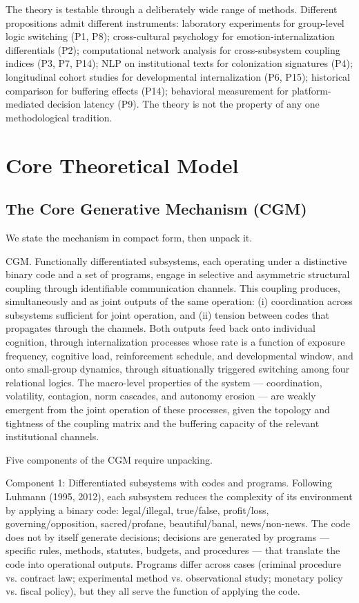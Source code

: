 \documentclass[12pt,a4paper]{article}
\begin{document}
The theory is testable through a deliberately wide range of methods. Different propositions admit different instruments: laboratory experiments for group-level logic switching (P1, P8); cross-cultural psychology for emotion-internalization differentials (P2); computational network analysis for cross-subsystem coupling indices (P3, P7, P14); NLP on institutional texts for colonization signatures (P4); longitudinal cohort studies for developmental internalization (P6, P15); historical comparison for buffering effects (P14); behavioral measurement for platform-mediated decision latency (P9). The theory is not the property of any one methodological tradition.



\section{Core Theoretical Model}

\subsection{The Core Generative Mechanism (CGM)}

We state the mechanism in compact form, then unpack it.


CGM. Functionally differentiated subsystems, each operating under a distinctive binary code and a set of programs, engage in selective and asymmetric structural coupling through identifiable communication channels. This coupling produces, simultaneously and as joint outputs of the same operation: (i) coordination across subsystems sufficient for joint operation, and (ii) tension between codes that propagates through the channels. Both outputs feed back onto individual cognition, through internalization processes whose rate is a function of exposure frequency, cognitive load, reinforcement schedule, and developmental window, and onto small-group dynamics, through situationally triggered switching among four relational logics. The macro-level properties of the system --- coordination, volatility, contagion, norm cascades, and autonomy erosion --- are weakly emergent from the joint operation of these processes, given the topology and tightness of the coupling matrix and the buffering capacity of the relevant institutional channels.


Five components of the CGM require unpacking.


Component 1: Differentiated subsystems with codes and programs. Following Luhmann (1995, 2012), each subsystem reduces the complexity of its environment by applying a binary code: legal/illegal, true/false, profit/loss, governing/opposition, sacred/profane, beautiful/banal, news/non-news. The code does not by itself generate decisions; decisions are generated by programs --- specific rules, methods, statutes, budgets, and procedures --- that translate the code into operational outputs. Programs differ across cases (criminal procedure vs. contract law; experimental method vs. observational study; monetary policy vs. fiscal policy), but they all serve the function of applying the code.
\end{document}
